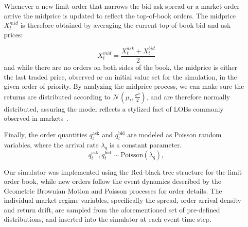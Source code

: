 Whenever a new limit order that narrows the bid-ask spread or a market order arrive the midprice is updated to reflect the top-of-book orders.
The midprice $X_{t}^{mid}$ is therefore obtained by averaging the current top-of-book bid and ask prices:

\[
    X_{t}^{mid} = \frac{X_{t}^{ask} + X_{t}^{bid}}{2}
\]
and while there are no orders on both sides of the book, the midprice is either the last traded price,
observed or an initial value set for the simulation, in the given order of priority.
By analyzing the midprice process, we can make sure the returns are distributed according to $\mathcal{N}\left(\mu_t, \frac{\sigma^2}{2}\right)$,
and are therefore normally distributed, assuring the model reflects a stylized fact of LOBs commonly observed in markets~\cite{Gueant2022}.

Finally, the order quantities $q_t^{\text{ask}}$ and $q_t^{\text{bid}}$ are modeled as Poisson random variables, where the arrival rate $\lambda_q$ is a constant parameter.
\[
    q_t^{\text{ask}}, q_t^{\text{bid}} \sim \text{Poisson}(\lambda_q),
\]

Our simulator was implemented using the Red-black tree structure for the limit order book, while new orders follow the event dynamics described
by the Geometric Brownian Motion and Poisson processes for order details.
The individual market regime variables, specifically the spread, order arrival density and return drift,
are sampled from the aforementioned set of pre-defined distributions, and inserted into the simulator at each event time step.